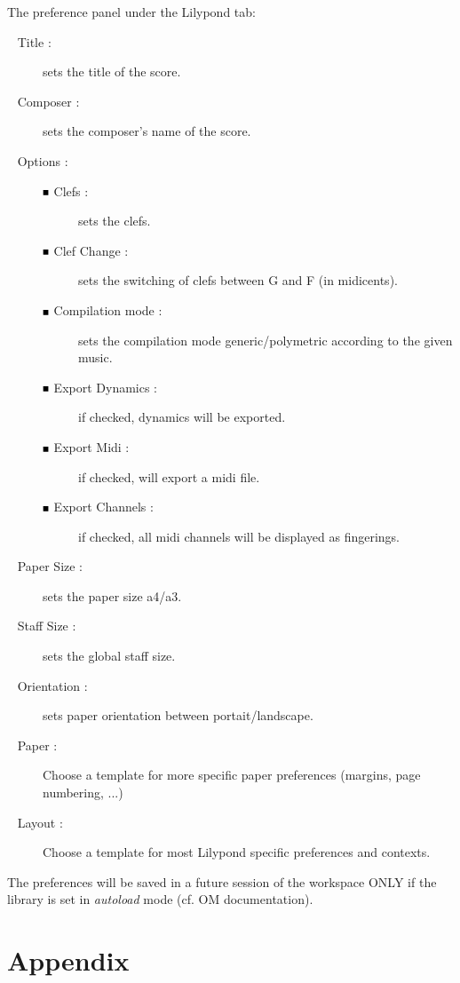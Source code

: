 \documentclass{article}
\newcommand\bck{$\scalebox{0.6}{$\blacksquare$}~$}
\begin{document}
The preference panel under the Lilypond tab:\\
\begin{description}
\item [\textbullet~ Title :]	 sets the title of the score.

\item [\textbullet~ Composer :] sets the composer's name of the score.

\item [\textbullet~ Options :] \phantom{}
  \begin{description}
  \item [\bck Clefs :]  sets the clefs. 
  \item [\bck Clef Change :] sets the switching of clefs between G and F (in midicents). 
  \item [\bck Compilation mode :] sets the compilation mode generic/polymetric according to the given music.
  \item [\bck Export Dynamics :] if checked, dynamics will be exported.
  \item [\bck Export Midi :] if checked, will export a midi file.
  \item [\bck Export Channels :] if checked, all midi channels will be displayed as fingerings.
  \end{description}

\item [\textbullet~ Paper Size :] sets the paper size a4/a3.

\item [\textbullet~ Staff Size :] sets the global staff size.

\item [\textbullet~ Orientation :] sets paper orientation between portait/landscape.

\item [\textbullet~ Paper :] Choose a template for more specific paper preferences (margins, page numbering, ...)

\item [\textbullet~ Layout :] Choose a template for most Lilypond specific preferences and contexts.

\end{description}

The preferences will be saved in a future session of the workspace ONLY if the library is set in \textit{autoload} mode (cf. OM documentation).
\appendix
\section{Appendix}
\end{document}

